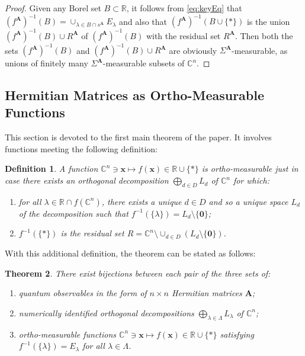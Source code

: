 \documentclass[11pt]{article}
\newcommand \R { \mathbb{R} }
\newcommand \C { \mathbb{C} }
\newtheorem{theorem}{Theorem}[section]
\newtheorem{definition}[theorem]{Definition}
\begin{document}
\begin{proof}
	Given any Borel set $B \subset \R$, it follows from \eqref{eq:keyEq} that
 \( ( f^{ \mathbf A} )^{-1} (B) = \cup _{ \lambda \in B \cap s^{ \mathbf A} } E_\lambda \)
 	and also that $( f^{ \mathbf A} )^{-1} (B \cup \{ * \}) $ 
	is the union $( f^{ \mathbf A} )^{-1} (B) \cup R^{ \mathbf A} $
	of $( f^{ \mathbf A} )^{-1} (B) $ with the residual set $ R^{ \mathbf A} $.
	Then both the sets $( f^{ \mathbf A} )^{-1} (B) $ 
	and $( f^{ \mathbf A} )^{-1} (B) \cup R^{ \mathbf A} $
	are obviously $ \Sigma ^{ \mathbf A} $-measurable, 
	as unions of finitely many $ \Sigma ^{ \mathbf A} $-measurable subsets of $ \C^n $.
\end{proof}

\subsection{Hermitian Matrices as Ortho-Measurable Functions} \label{ss:orthMeasFns}

This section is devoted to the first main theorem of the paper.
It involves functions meeting the following definition:

\begin{definition} \label{def:orthMeasFn}
	A function \( \C^n \owns \mathbf x \mapsto f( \mathbf x) \in \R \cup \{*\} \) 
	is \emph{ortho-measurable} just in case there exists 
	an orthogonal decomposition $ \bigoplus _{d \in D} L_d $ of $ \C^n $ for which:
	\begin{enumerate}
		\item for all $ \lambda \in \R \cap f( \C^n )$, there exists
		a unique $d \in D$ and so a unique space $ L_d $ of the decomposition such that
		 $ f^{-1} ( \{ \lambda \} ) = L_d \setminus \{ \mathbf 0 \}$;
		\item $ f^{-1} ( \{*\} )$ is the residual set 
 \( R = \C^n \setminus \cup _{d \in D} ( L_d \setminus \{ \mathbf 0 \} ) \).
	\end{enumerate}
\end{definition}

With this additional definition, the theorem can be stated as follows:

\begin{theorem} \label{thm:threeBijections}
	There exist bijections between each pair of the three sets of:
\begin{enumerate}
	\item quantum observables in the form of $n \times n$ Hermitian matrices $ \mathbf A$;
	 \item numerically identified 
	 orthogonal decompositions $ \bigoplus _{ \lambda \in \Lambda } L_\lambda $ of $ \C^n $; 
	\item ortho-measurable functions
	 \( \C^n \owns \mathbf x \mapsto f( \mathbf x) \in \R \cup \{*\} \)
	 satisfying $ f^{-1} ( \{ \lambda \} ) = E_\lambda $ for all $ \lambda \in \Lambda $.
\end{enumerate}
\end{theorem}
\end{document}
